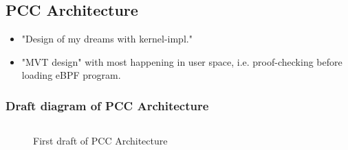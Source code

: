 \subsection{PCC Architecture}
\label{subsec:pcc_architecture}

\begin{itemize}
    \item "Design of my dreams with kernel-impl."  
    \item "MVT design" with most happening in user space, i.e. proof-checking before loading eBPF program.  
\end{itemize}




\subsubsection*{Draft diagram of PCC Architecture}

\begin{figure}[htbp!]
  \centering
\inputminted{text}{figures/pcc-architecture.txt}
  \caption{First draft of PCC Architecture}
  \label{fig:pcc-architecture}
\end{figure}

